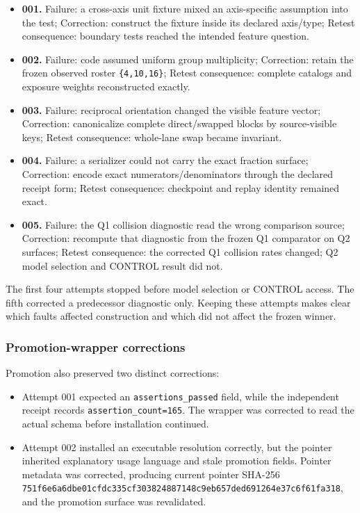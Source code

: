 \begin{itemize}
\tightlist
\item
  \textbf{001.} Failure: a cross-axis unit fixture mixed an
  axis-specific assumption into the test; Correction: construct the
  fixture inside its declared axis/type; Retest consequence: boundary
  tests reached the intended feature question.
\item
  \textbf{002.} Failure: code assumed uniform group multiplicity;
  Correction: retain the frozen observed roster \texttt{\{4,10,16\}};
  Retest consequence: complete catalogs and exposure weights
  reconstructed exactly.
\item
  \textbf{003.} Failure: reciprocal orientation changed the visible
  feature vector; Correction: canonicalize complete direct/swapped
  blocks by source-visible keys; Retest consequence: whole-lane swap
  became invariant.
\item
  \textbf{004.} Failure: a serializer could not carry the exact fraction
  surface; Correction: encode exact numerators/denominators through the
  declared receipt form; Retest consequence: checkpoint and replay
  identity remained exact.
\item
  \textbf{005.} Failure: the Q1 collision diagnostic read the wrong
  comparison source; Correction: recompute that diagnostic from the
  frozen Q1 comparator on Q2 surfaces; Retest consequence: the corrected
  Q1 collision rates changed; Q2 model selection and CONTROL result did
  not.
\end{itemize}

The first four attempts stopped before model selection or CONTROL
access. The fifth corrected a predecessor diagnostic only. Keeping these
attempts makes clear which faults affected construction and which did
not affect the frozen winner.

\subsubsection{Promotion-wrapper
corrections}\label{viii-ch07-promotion-wrapper-corrections}

Promotion also preserved two distinct corrections:

\begin{itemize}
\tightlist
\item
  Attempt 001 expected an \texttt{assertions\_passed} field, while the
  independent receipt records \texttt{assertion\_count=165}. The wrapper
  was corrected to read the actual schema before installation continued.
\item
  Attempt 002 installed an executable resolution correctly, but the
  pointer inherited explanatory usage language and stale promotion
  fields. Pointer metadata was corrected, producing current pointer
  SHA-256
  \nolinkurl{751f6e6a6dbe01cfdc335cf303824887148c9eb657ded691264e37c6f61fa318},
  and the promotion surface was revalidated.
\end{itemize}

